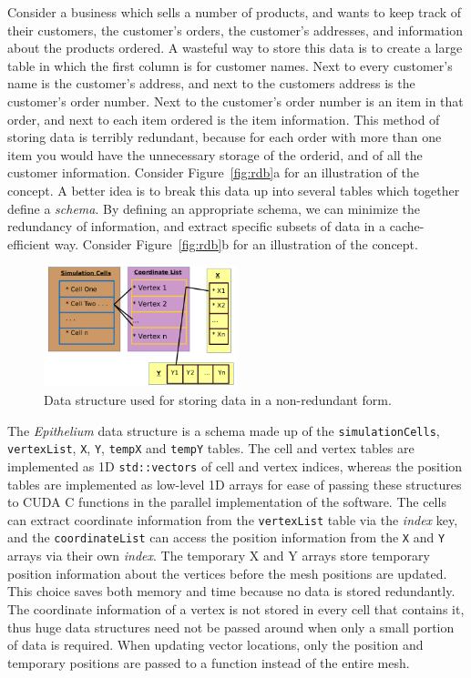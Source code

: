 Consider a business which sells a number of products, and wants to keep 
track of their customers, the customer's orders, the customer's 
addresses, and information about the products ordered. A wasteful way 
to store this data is to create a large table in which the first column 
is for customer names. Next to every customer's name is the customer's 
address, and next to the customers address is the customer's order 
number. Next to the customer's order number is an item in that order, 
and next to each item ordered is the item information. This method of 
storing data is terribly redundant, because for each order with more 
than one item you would have the unnecessary storage of the orderid, and of all 
the customer information. Consider Figure~\ref{fig:rdb}a for an illustration of the concept.
A better idea is to break this data up into several tables which 
together define a \emph{schema}. By defining an appropriate schema, we can minimize the redundancy of information, and extract specific subsets of data in a cache-efficient way. Consider Figure~\ref{fig:rdb}b for an illustration of the concept.

\begin{figure}[h]
\centering
\includegraphics[width=0.5\textwidth]{../diagrams/ds.png}
\caption{Data structure used for storing data in a non-redundant form.}
\end{figure}

The \emph{Epithelium} data structure is a schema made up of the \texttt{simulationCells}, \texttt{vertexList}, \texttt{X}, \texttt{Y}, \texttt{tempX} and \texttt{tempY} tables. The cell and vertex tables are implemented as 1D \texttt{std::vectors} of cell and vertex indices, whereas the position tables are implemented as low-level 1D arrays for ease of passing these structures to CUDA C functions in the parallel implementation of the software. The cells can extract coordinate information from the \texttt{vertexList} table via the \emph{index} key, and the \texttt{coordinateList} can access the position information from the \texttt{X} and \texttt{Y} arrays via their own \emph{index}. The temporary X and Y arrays store temporary position information about the vertices before the mesh positions are updated. This choice saves both memory and time because no data is stored redundantly. The coordinate information of a vertex is not stored in every cell that contains it, thus huge data structures need not be passed around when only a small portion of data is required. When updating vector locations, only the position and temporary positions are passed to a function instead of the entire mesh. 

